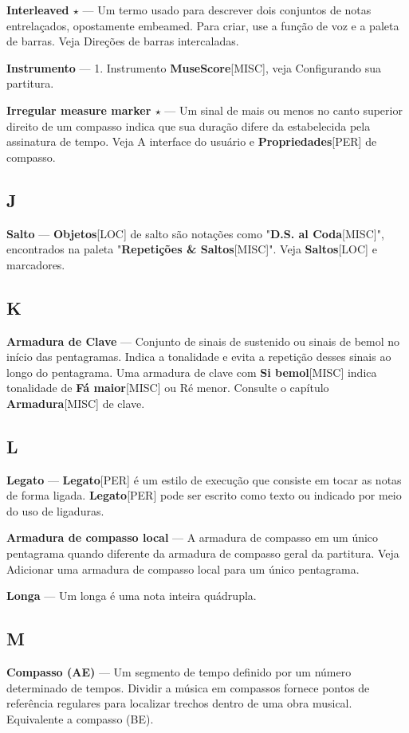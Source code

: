 \documentclass[a4paper,12pt]{article}
\begin{document}
\textbf{Interleaved $\star$} --- Um termo usado para descrever dois conjuntos de notas entrelaçados, opostamente embeamed. Para criar, use a função de voz e a paleta de barras. Veja Direções de barras intercaladas.

\textbf{Instrumento} --- 1. Instrumento \textbf{MuseScore}\textsc{[MISC]}, veja Configurando sua partitura.

\textbf{Irregular measure marker $\star$} --- Um sinal de mais ou menos no canto superior direito de um compasso indica que sua duração difere da estabelecida pela assinatura de tempo. Veja A interface do usuário e \textbf{Propriedades}\textsc{[PER]} de compasso.

\subsection*{J}
\textbf{Salto} --- \textbf{Objetos}\textsc{[LOC]} de salto são notações como "\textbf{D.S. al Coda}\textsc{[MISC]}", encontrados na paleta "\textbf{Repetições \& Saltos}\textsc{[MISC]}". Veja \textbf{Saltos}\textsc{[LOC]} e marcadores.

\subsection*{K}
\textbf{Armadura de Clave} --- Conjunto de sinais de sustenido ou sinais de bemol no início das pentagramas. Indica a tonalidade e evita a repetição desses sinais ao longo do pentagrama. Uma armadura de clave com \textbf{Si bemol}\textsc{[MISC]} indica tonalidade de \textbf{Fá maior}\textsc{[MISC]} ou Ré menor. Consulte o capítulo \textbf{Armadura}\textsc{[MISC]} de clave.

\subsection*{L}
\textbf{Legato} --- \textbf{Legato}\textsc{[PER]} é um estilo de execução que consiste em tocar as notas de forma ligada. \textbf{Legato}\textsc{[PER]} pode ser escrito como texto ou indicado por meio do uso de ligaduras.

\textbf{Armadura de compasso local} --- A armadura de compasso em um único pentagrama quando diferente da armadura de compasso geral da partitura. Veja Adicionar uma armadura de compasso local para um único pentagrama.

\textbf{Longa} --- Um longa é uma nota inteira quádrupla.

\subsection*{M}
\textbf{Compasso (AE)} --- Um segmento de tempo definido por um número determinado de tempos. Dividir a música em compassos fornece pontos de referência regulares para localizar trechos dentro de uma obra musical. Equivalente a compasso (BE).
\end{document}
